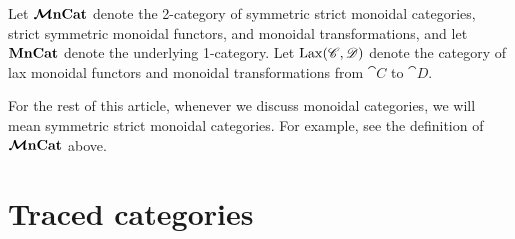 \documentclass[11pt,oneside,article]{memoir}
\begin{document}
Let $\bm{\mathcal{M}}\mathbf{nCat}$ denote the 2-category of symmetric strict monoidal categories, strict symmetric
monoidal functors, and monoidal transformations, and let $\mathbf{MnCat}$ denote the underlying 1-category.
Let $\operatorname{Lax}(\mathscr{C},\mathscr{D})$ denote the category of lax monoidal functors and monoidal
transformations from $\cat{C}$ to $\cat{D}$.

\begin{warning}
      \label{warn:symmetric}
   For the rest of this article, whenever we discuss monoidal categories, we will mean symmetric
   strict monoidal categories. For example, see the definition of $\bm{\mathcal{M}}\mathbf{nCat}$ above.
\end{warning}

\section{Traced categories}
      \label{sec:intuition_for_traced}
\end{document}
